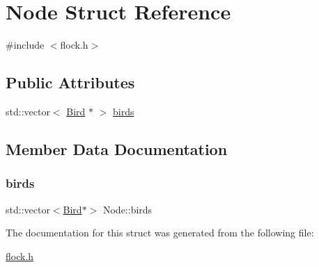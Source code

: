 \hypertarget{structNode}{}\section{Node Struct Reference}
\label{structNode}


{\ttfamily \#include $<$flock.\+h$>$}

\subsection*{Public Attributes}
\begin{DoxyCompactItemize}
\item 
std\+::vector$<$ \hyperlink{classBird}{Bird} $\ast$ $>$ \hyperlink{structNode_a6649eb5fac4e4c97f592b823a5b113ed}{birds}
\end{DoxyCompactItemize}


\subsection{Member Data Documentation}
\mbox{\label{structNode_a6649eb5fac4e4c97f592b823a5b113ed}} 
\subsubsection{\texorpdfstring{birds}{birds}}
{\footnotesize\ttfamily std\+::vector$<$\hyperlink{classBird}{Bird}$\ast$$>$ Node\+::birds}



The documentation for this struct was generated from the following file\+:\begin{DoxyCompactItemize}
\item 
\hyperlink{flock_8h}{flock.\+h}\end{DoxyCompactItemize}
